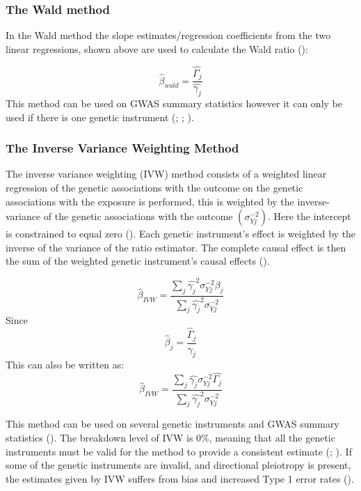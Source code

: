 \documentclass[
]{article}
\begin{document}
\subsubsection{\texorpdfstring{\textbf{The Wald
method}}{The Wald method}}\label{the-wald-method}

In the Wald method the slope estimates/regression coefficients from the
two linear regressions, shown above are used to calculate the Wald ratio
():

\[\hat{\beta}_{wald} = \frac{\hat{\Gamma_j}}{\hat{\gamma_j}}\tag{4}\]
This method can be used on GWAS summary statistics however it can only
be used if there is one genetic instrument
(;
;
).

\subsubsection{\texorpdfstring{\textbf{The Inverse Variance Weighting
Method}}{The Inverse Variance Weighting Method}}\label{the-inverse-variance-weighting-method}

The inverse variance weighting (IVW) method consists of a weighted
linear regression of the genetic associations with the outcome on the
genetic associations with the exposure is performed, this is weighted by
the inverse-variance of the genetic associations with the outcome
\((\sigma_{Yj}^{-2})\). Here the intercept is constrained to equal zero
(). Each
genetic instrument's effect is weighted by the inverse of the variance
of the ratio estimator. The complete causal effect is then the sum of
the weighted genetic instrument's causal effects
().

\[\hat{\beta}_{IVW} = \frac{\sum_{j}\hat{\gamma_j}^2\sigma_{Yj}^{-2}\hat{\beta_j}}{\sum_{j}\hat{\gamma_j}^2\sigma_{Yj}^{-2}}\tag{5}\]
Since \[\hat\beta_j=\frac{\hat\Gamma_j}{\gamma_j}\tag{6}\] This can also
be written as:
\[\hat{\beta}_{IVW} = \frac{\sum_{j}\hat{\gamma_j}\sigma_{Yj}^{-2}\hat{\Gamma_j}}{\sum_{j}\hat{\gamma_j}^2\sigma_{Yj}^{-2}}\tag{7}\]

This method can be used on several genetic instruments and GWAS summary
statistics (). The
breakdown level of IVW is 0\%, meaning that all the genetic instruments
must be valid for the method to provide a consistent estimate
(;
). If some of
the genetic instruments are invalid, and directional pleiotropy is
present, the estimates given by IVW suffers from bias and increased Type
1 error rates ().
\end{document}
